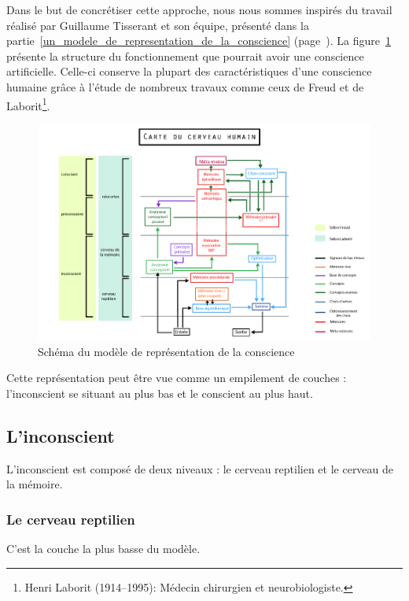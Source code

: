 Dans le but de concrétiser cette approche, nous nous sommes inspirés du travail réalisé par \mbox{Guillaume} \mbox{Tisserant} et son équipe, présenté dans la partie~\ref{un_modele_de_representation_de_la_conscience} (page~\pageref{un_modele_de_representation_de_la_conscience}). La figure~\ref{modele_original} présente la structure du fonctionnement que pourrait avoir une conscience artificielle. Celle-ci conserve la plupart des caractéristiques d’une conscience humaine grâce à l'étude de nombreux travaux comme ceux de Freud et de Laborit\footnote{Henri Laborit (1914--1995): Médecin chirurgien et neurobiologiste.}.

\begin{figure}[H] 
\centering
\includegraphics[width=\textwidth]{files/modele_original} 
\caption{Schéma du modèle de représentation de la conscience} 
\label{modele_original}
\end{figure}

Cette représentation peut être vue comme un empilement de couches : l'inconscient se situant au plus bas et le conscient au plus haut.

\subsection{L'inconscient}
L'inconscient est composé de deux niveaux : le cerveau reptilien et le cerveau de la mémoire.

\subsubsection{Le cerveau reptilien}

C'est la couche la plus basse du modèle.

